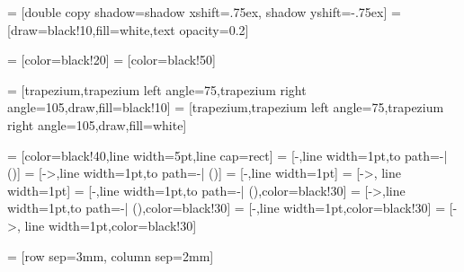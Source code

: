  = [double copy shadow={shadow xshift=.75ex, shadow yshift=-.75ex}]
 = [draw=black!10,fill=white,text opacity=0.2]

 = [color=black!20]
 = [color=black!50]

\newcommand{\dataRightAngle}{105}
\newcommand{\dataLeftAngle}{75}

 = [trapezium,trapezium left angle=\dataLeftAngle,trapezium right angle=\dataRightAngle,draw,fill=black!10]
 = [trapezium,trapezium left angle=\dataLeftAngle,trapezium right angle=\dataRightAngle,draw,fill=white]

 = [color=black!40,line width=5pt,line cap=rect]
 = [-,line width=1pt,to path={-| (\tikztotarget)}]
 = [->,line width=1pt,to path={-| (\tikztotarget)}]
 = [-,line width=1pt]
 = [->, line width=1pt]
 = [-,line width=1pt,to path={-| (\tikztotarget)},color=black!30]
 = [->,line width=1pt,to path={-| (\tikztotarget)},color=black!30]
 = [-,line width=1pt,color=black!30]
 = [->, line width=1pt,color=black!30]

 = [row sep=3mm, column sep=2mm]



\newcommand{\MultilineComponent}[2]
{
	\begin{minipage}{#1}
	\begin{center}
		#2
	\end{center}
	\end{minipage}
}

\newcommand{\TwolineComponent}[3]
{
	\begin{minipage}{#1}
	\begin{center}
		#2 \linebreak #3
	\end{center}
	\end{minipage}
}

